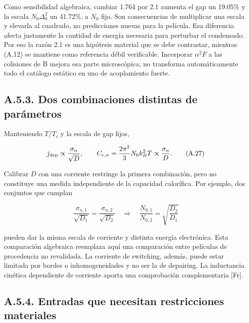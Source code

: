 \documentclass[
  spanish,
  10pt,
  a4paper,
]{article}
\begin{document}
Como sensibilidad algebraica, cambiar 1.764 por 2.1 aumenta el gap un
19.05\% y la escala \(N_0\Delta_0^2\) un 41.72\%, a \(N_0\) fijo. Son
consecuencias de multiplicar una escala y elevarla al cuadrado, no
predicciones nuevas para la película. Esa diferencia afecta justamente
la cantidad de energía necesaria para perturbar el condensado. Por eso
la razón 2.1 es una hipótesis material que se debe contrastar, mientras
(A.12) se mantiene como referencia débil verificable. Incorporar
\(\alpha^2F\) a las colisiones de B mejora esa parte microscópica; no
transforma automáticamente todo el catálogo estático en uno de
acoplamiento fuerte.

\subsection{A.5.3. Dos combinaciones distintas de
parámetros}\label{a.5.3.-dos-combinaciones-distintas-de-paruxe1metros}

Manteniendo \(T/T_c\) y la escala de gap fijos,

\[
j_{\rm dep}\propto\frac{\sigma_n}{\sqrt D},
\qquad C_{e,n}=\frac{2\pi^2}{3}N_0k_B^2T
\propto\frac{\sigma_n}{D}.
\tag{A.27}
\]

Calibrar \(D\) con una corriente restringe la primera combinación, pero
no constituye una medida independiente de la capacidad calorífica. Por
ejemplo, dos conjuntos que cumplan

\[
\frac{\sigma_{n,1}}{\sqrt{D_1}}
=\frac{\sigma_{n,2}}{\sqrt{D_2}}
\quad\Longrightarrow\quad
\frac{N_{0,1}}{N_{0,2}}=\sqrt{\frac{D_2}{D_1}}
\tag{A.28}
\]

pueden dar la misma escala de corriente y distinta energía electrónica.
Esta comparación algebraica reemplaza aquí una comparación entre
películas de procedencia no revalidada. La corriente de switching,
además, puede estar limitada por bordes o inhomogeneidades y no ser la
de depairing. La inductancia cinética dependiente de corriente aporta
una comprobación complementaria {[}Fr{]}.

\subsection{A.5.4. Entradas que necesitan restricciones
materiales}\label{a.5.4.-entradas-que-necesitan-restricciones-materiales}
\end{document}
